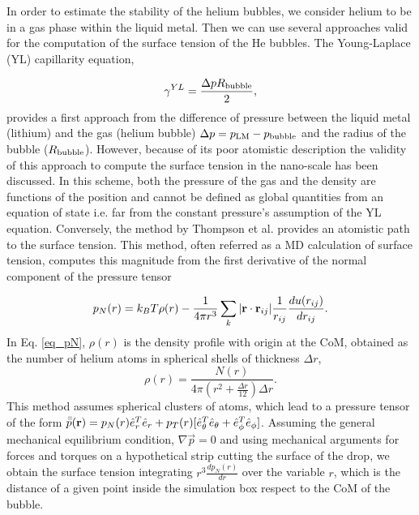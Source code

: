 \documentclass[jcp,amsmath,amssymb,preprint]{revtex4-1}
\begin{document}
In order to estimate the stability of the helium bubbles, we consider helium to be in a gas phase within the liquid metal. Then 
we can use several approaches valid for the computation of the surface tension of the He bubbles.  The Young-Laplace (YL) capillarity equation\cite{thompson1984molecular},

\begin{equation}
            \gamma^{YL} = \frac{\Delta p R_{\rm bubble}} {2},
            \label{eq_laplace}
\end{equation}
provides a first approach from the difference of pressure between the liquid metal (lithium) and the gas (helium 
bubble) $\Delta p = p_{\rm LM} - p_{\rm bubble}$ and the radius of the bubble ($R_{\rm bubble}$).  However, because 
of its poor atomistic description the validity of this approach to compute the surface tension in the nano-scale has been discussed\cite{caro2015capillarity,park2001molecular}.  In this scheme,  both the pressure of the gas and the density are functions of the position and cannot be defined as global quantities from an equation of state\cite{caro2013structure} i.e.  far from the constant pressure's assumption of the YL equation.  Conversely, the method by Thompson et al.\cite{thompson1984molecular} provides an atomistic path to the surface tension. This method, often referred as a MD calculation of surface tension,  computes this magnitude from the first derivative of the normal component of the pressure tensor
        
\begin{equation} \label{eq_pN}
p_N (r) = k_B T \rho (r) - \frac{1}{4 \pi r^3} \sum _k |{{\bf r} \cdot {\bf r}_{ij}}|\frac{1}{r_{ij}} \frac{du(r_{ij})}{dr_{ij}}.
\end{equation}
In Eq. \ref{eq_pN}, $\rho(r)$ is the density profile with origin at the CoM, obtained as the number of helium atoms in spherical shells of thickness $\Delta r$,
\begin{equation}
\rho (r) = \frac{N(r)}{4 \pi (r^2 + \frac{\Delta r}{12})\Delta r}.
\end{equation}
This method assumes spherical clusters of atoms,  which lead to a pressure tensor of the form $\Bar{\bar{p}}({\bf r})=p_N(r)\hat{e}_r^T\hat{e}_r + p_T(r)[\hat{e}_\theta^T \hat{e}_\theta+\hat{e}_\phi^T \hat{e}_\phi]$. Assuming the general mechanical equilibrium condition, $\nabla \vec{p} = 0 $ and using mechanical arguments for forces and torques on a hypothetical strip cutting the surface of the drop\cite{thompson1984molecular}, we obtain the surface tension integrating $\displaystyle r^3 \frac{dp_N(r)}{dr}$ over the variable $r$, which is the distance of a given point inside the simulation box respect to the CoM of the bubble.
\end{document}
